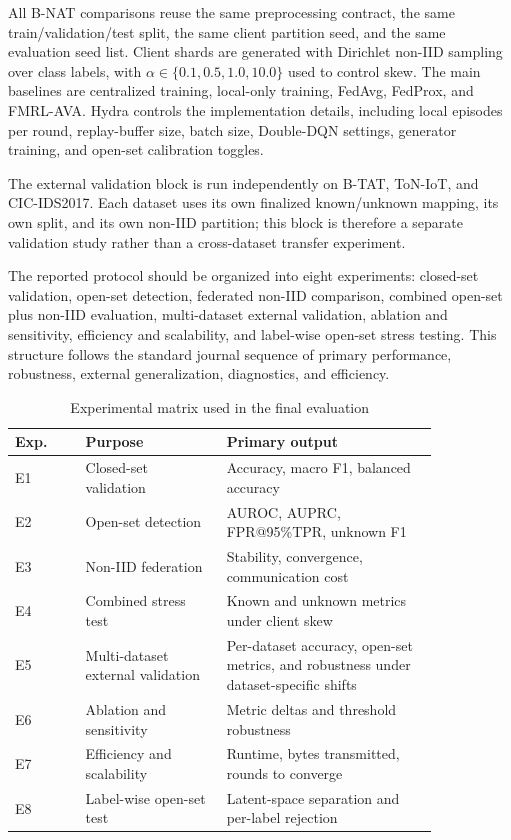 \documentclass[10pt,twocolumn]{article}
\begin{document}
All B-NAT comparisons reuse the same preprocessing contract, the same train/validation/test split, the same client partition seed, and the same evaluation seed list. Client shards are generated with Dirichlet non-IID sampling over class labels, with \(\alpha \in \{0.1, 0.5, 1.0, 10.0\}\) used to control skew. The main baselines are centralized training, local-only training, FedAvg, FedProx, and FMRL-AVA. Hydra controls the implementation details, including local episodes per round, replay-buffer size, batch size, Double-DQN settings, generator training, and open-set calibration toggles.

The external validation block is run independently on B-TAT, ToN-IoT, and CIC-IDS2017. Each dataset uses its own finalized known/unknown mapping, its own split, and its own non-IID partition; this block is therefore a separate validation study rather than a cross-dataset transfer experiment.

The reported protocol should be organized into eight experiments: closed-set validation, open-set detection, federated non-IID comparison, combined open-set plus non-IID evaluation, multi-dataset external validation, ablation and sensitivity, efficiency and scalability, and label-wise open-set stress testing. This structure follows the standard journal sequence of primary performance, robustness, external generalization, diagnostics, and efficiency.

\begin{table}[t]
\centering
\caption{Experimental matrix used in the final evaluation}
\begin{tabular}{p{0.14\linewidth}p{0.28\linewidth}p{0.42\linewidth}}
\toprule
\textbf{Exp.} & \textbf{Purpose} & \textbf{Primary output} \\
\midrule
E1 & Closed-set validation & Accuracy, macro F1, balanced accuracy \\
E2 & Open-set detection & AUROC, AUPRC, FPR@95\%TPR, unknown F1 \\
E3 & Non-IID federation & Stability, convergence, communication cost \\
E4 & Combined stress test & Known and unknown metrics under client skew \\
E5 & Multi-dataset external validation & Per-dataset accuracy, open-set metrics, and robustness under dataset-specific shifts \\
E6 & Ablation and sensitivity & Metric deltas and threshold robustness \\
E7 & Efficiency and scalability & Runtime, bytes transmitted, rounds to converge \\
E8 & Label-wise open-set test & Latent-space separation and per-label rejection \\
\bottomrule
\end{tabular}
\end{table}
\end{document}

